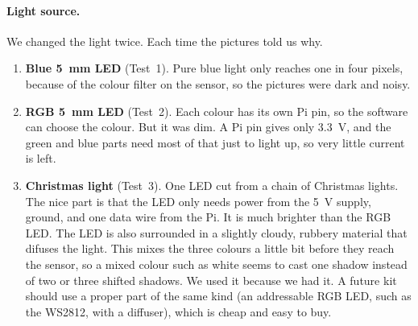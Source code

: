 \paragraph{Light source.}
We changed the light twice. Each time the pictures told us why.
\begin{enumerate}
  \item \textbf{Blue 5~mm LED} (Test~1). Pure blue light only reaches one in four pixels,
  because of the colour filter on the sensor, so the pictures were dark and noisy.
  \item \textbf{RGB 5~mm LED} (Test~2). Each colour has its own Pi pin, so the software can
  choose the colour. But it was dim. A Pi pin gives only 3.3~V, and the green and blue parts
  need most of that just to light up, so very little current is left.
  \item \textbf{Christmas light} (Test~3). One LED cut from a chain of Christmas
  lights. The nice part is that the LED only needs power
  from the 5~V supply, ground, and one data wire from the Pi. It is much brighter than the
  RGB LED. The LED is also surrounded in a slightly cloudy, rubbery material that difuses the
  light. This mixes the three colours a little bit before they reach the sensor, so a mixed colour such as
  white seems to cast one shadow instead of two or three shifted shadows.
  We used it because we had it. A future kit should use a proper part of the same kind (an
  addressable RGB LED, such as the WS2812, with a diffuser), which is cheap and easy to buy.
\end{enumerate}
